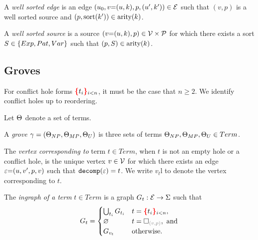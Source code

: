 \begin{definition}
  A \emph{well sorted edge} is an edge $(u_0, v{=}(u, k), p, (u', k')) \in \E$
  such that $(v, p)$ is a well sorted source
  and $(p, \sort{k'}) \in \arity{k}$.
\end{definition}

\begin{definition}
  A \emph{well sorted source} is a source $(v{=}(u, k), p) \in \V \times \P$
  for which there exists a sort $S \in \SetOf{Exp, Pat, Var}$
  such that $(p, S) \in \arity{k}$.
\end{definition}


\subsection{Groves}
\label{sec:Formalism:Groves}

\figureTermSyntaxContent

For conflict hole forms $\conflictHole[i < n]{t_i}$,
it must be the case that $n \geq 2$.
We identify conflict holes up to reordering.

Let $\Set$ denote a set of terms.

\begin{definition}
  A \emph{grove} $\Grove = (\Set[NP], \Set[MP], \Set[U])$
  is three sets of terms $\Set[NP], \Set[MP], \Set[U] \in Term$.
\end{definition}

\begin{definition}
  The \emph{vertex corresponding to} term $t \in Term$,
  when $t$ is not an empty hole or a conflict hole,
  is the unique vertex $v \in \V$ for which there exists an edge $\e{=}(u, v', p, v)$
  such that $\decomp{\e} = t$.
  We write $v_t$l to denote the vertex corresponding to $t$.
\end{definition}

\begin{definition}
  The \emph{ingraph of a term} $t \in Term$ is a graph $G_t : \E \rightarrow \Sigma$ such that
  \[
    G_t =
    \begin{cases}
      \bigcup_{t_i} G_{t_i} & t = \conflictHole[i < n]{t_i}, \\
      \varnothing & t = \emptyHole{v}{p}, \text{ and} \\
      G_{v_t} & \text{otherwise.} \\
    \end{cases}
  \]
\end{definition}

